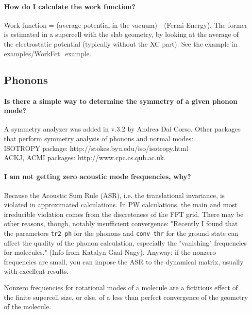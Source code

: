 \documentclass[12pt,a4paper]{article}
\begin{document}
\paragraph{How do I calculate the work function?}

Work function = (average potential in the vacuum) - (Fermi
Energy). The former is estimated in a supercell with the slab
geometry, by looking at the average of the electrostatic potential
(typically without the XC part). See the example in
examples/WorkFct\_example. 

\subsection{ Phonons }

\paragraph{ Is there a simple way to determine the symmetry of a given 
phonon mode?} 

A symmetry analyzer was added in v.3.2 by Andrea Dal Corso. 
Other packages that perform symmetry analysis of phonons and normal modes:\\
ISOTROPY package: http://stokes.byu.edu/iso/isotropy.html\\
ACKJ, ACMI packages: http://www.cpc.cs.qub.ac.uk.

\paragraph{I am not getting zero acoustic mode frequencies, why? }

Because the Acoustic Sum Rule (ASR), i.e. the translational invariance,
is violated in approximated calculations. In PW calculations, 
the main and most irreducible violation comes from the discreteness
of the FFT grid. There may be other reasons, though, notably
insufficient convergence: "Recently I found that the parameters
\texttt{tr2\_ph} for the phonons and \texttt{conv\_thr} for the 
ground state can affect the quality of the phonon calculation,
 especially the "vanishing" frequencies for molecules."
(Info from Katalyn Gaal-Nagy). Anyway: if the nonzero frequencies are
small, you can impose the ASR to the dynamical matrix, usually with
excellent results.

Nonzero frequencies for rotational modes of a molecule are a fictitious 
effect of the finite supercell size, or else, of a less than perfect
convergence of the geometry of the molecule.
\end{document}
